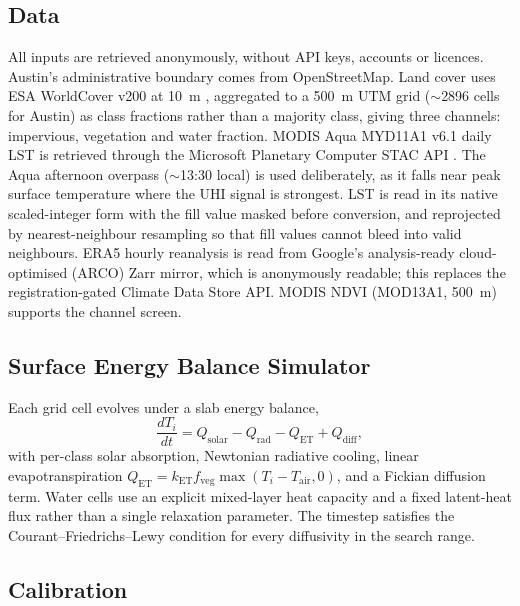 \documentclass[remotesensing,article,submit,oneauthor]{Definitions/mdpi}
\begin{document}
\subsection{Data}

All inputs are retrieved anonymously, without API keys, accounts or
licences. Austin's administrative boundary comes from OpenStreetMap.
Land cover uses ESA WorldCover v200 at 10~m \cite{zanaga2022esa},
aggregated to a 500~m UTM grid ($\sim$2896 cells for Austin) as class
fractions rather than a majority class, giving three channels: impervious,
vegetation and water fraction. MODIS Aqua MYD11A1 v6.1 daily LST is
retrieved through the Microsoft Planetary Computer STAC API
\cite{microsoft_pc}. The Aqua afternoon overpass ($\sim$13:30 local) is
used deliberately, as it falls near peak surface temperature where the UHI
signal is strongest. LST is read in its native scaled-integer form with
the fill value masked before conversion, and reprojected by
nearest-neighbour resampling so that fill values cannot bleed into valid
neighbours. ERA5 hourly reanalysis \cite{hersbach2020era5} is read from
Google's analysis-ready cloud-optimised (ARCO) Zarr mirror, which is
anonymously readable; this replaces the registration-gated Climate Data
Store API. MODIS NDVI (MOD13A1, 500~m) supports the channel screen.

\subsection{Surface Energy Balance Simulator}

Each grid cell evolves under a slab energy balance,
\begin{equation}
\frac{dT_i}{dt} = Q_{\mathrm{solar}} - Q_{\mathrm{rad}}
                - Q_{\mathrm{ET}} + Q_{\mathrm{diff}},
\label{eq:slab}
\end{equation}
with per-class solar absorption, Newtonian radiative cooling, linear
evapotranspiration $Q_{\mathrm{ET}} = k_{\mathrm{ET}} f_{\mathrm{veg}}
\max(T_i - T_{\mathrm{air}}, 0)$, and a Fickian diffusion term. Water
cells use an explicit mixed-layer heat capacity and a fixed latent-heat
flux rather than a single relaxation parameter. The timestep satisfies
the Courant--Friedrichs--Lewy condition for every diffusivity in the
search range.

\subsection{Calibration}
\end{document}
